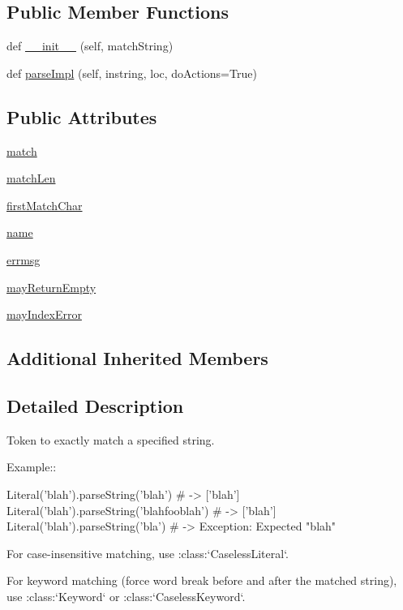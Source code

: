 \subsection*{Public Member Functions}
\begin{DoxyCompactItemize}
\item 
def \hyperlink{classpip_1_1__vendor_1_1pyparsing_1_1Literal_ab2a987382f4e63aaab4f5e3377216655}{\+\_\+\+\_\+init\+\_\+\+\_\+} (self, match\+String)
\item 
def \hyperlink{classpip_1_1__vendor_1_1pyparsing_1_1Literal_a38b0d9903eba5e7a8c8382d220ec8ea7}{parse\+Impl} (self, instring, loc, do\+Actions=True)
\end{DoxyCompactItemize}
\subsection*{Public Attributes}
\begin{DoxyCompactItemize}
\item 
\hyperlink{classpip_1_1__vendor_1_1pyparsing_1_1Literal_a910348b4961e5f776b88b8578f75d19c}{match}
\item 
\hyperlink{classpip_1_1__vendor_1_1pyparsing_1_1Literal_aca787ecff83a51462336def4f8cd4963}{match\+Len}
\item 
\hyperlink{classpip_1_1__vendor_1_1pyparsing_1_1Literal_a5c2bc59f4d0aa419481db197ac3099c3}{first\+Match\+Char}
\item 
\hyperlink{classpip_1_1__vendor_1_1pyparsing_1_1Literal_aee558197ac851636af8daba346d1291b}{name}
\item 
\hyperlink{classpip_1_1__vendor_1_1pyparsing_1_1Literal_a3a9595dd4dc715284f32a438c3439979}{errmsg}
\item 
\hyperlink{classpip_1_1__vendor_1_1pyparsing_1_1Literal_ab7e2a396d3b64b1b872b2c2c38895b54}{may\+Return\+Empty}
\item 
\hyperlink{classpip_1_1__vendor_1_1pyparsing_1_1Literal_ac7dcd533f4433d0e4963a8d6a01a04fb}{may\+Index\+Error}
\end{DoxyCompactItemize}
\subsection*{Additional Inherited Members}


\subsection{Detailed Description}
\begin{DoxyVerb}Token to exactly match a specified string.

Example::

    Literal('blah').parseString('blah')  # -> ['blah']
    Literal('blah').parseString('blahfooblah')  # -> ['blah']
    Literal('blah').parseString('bla')  # -> Exception: Expected "blah"

For case-insensitive matching, use :class:`CaselessLiteral`.

For keyword matching (force word break before and after the matched string),
use :class:`Keyword` or :class:`CaselessKeyword`.
\end{DoxyVerb}
 

